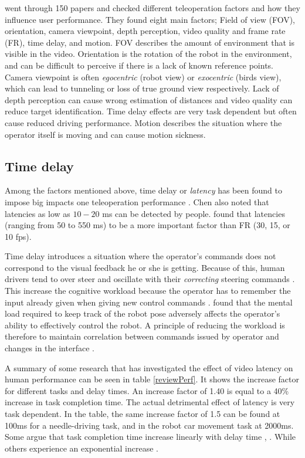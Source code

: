 \citet{Chen2007} went through 150 papers and checked different teleoperation factors and how they influence user performance. They found eight main factors; Field of view (FOV), orientation, camera viewpoint, depth perception, video quality and frame rate (FR), time delay, and motion. FOV describes the amount of environment that is visible in the video. Orientation is the rotation of the robot in the environment, and can be difficult to perceive if there is a lack of known reference points. Camera viewpoint is often \emph{egocentric} (robot view) or \emph{exocentric} (birds view), which can lead to tunneling or loss of true ground view respectively. Lack of depth perception can cause wrong estimation of distances and video quality can reduce target identification. Time delay effects are very task dependent but often cause reduced driving performance. Motion describes the situation where the operator itself is moving and can cause motion sickness.


\subsection{Time delay}
Among the factors mentioned above, time delay or \emph{latency} has been found to impose big impacts one teleoperation performance \citep{Chen2007}. Chen also noted that latencies as low as $10-20$ ms can be detected by people. \citet{Arthur1993} found that latencies (ranging from 50 to 550 ms) to be a more important factor than FR (30, 15, or 10 fps). 

Time delay introduces a situation where the operator's commands does not correspond to the visual feedback he or she is getting. Because of this, human drivers tend to over steer and oscillate with their \emph{correcting} steering commands \citep{Appelqvist2007}. This increase the cognitive workload because the operator has to remember the input already given when giving new control commands \citep{Matheson2013}. \citet{Ricks2004} found that the mental load required to keep track of the robot pose adversely affects the operator's ability to effectively control the robot. A principle of reducing the workload is therefore to maintain correlation between commands issued by operator and changes in the interface \citep{Nielsen2007}. 

A summary of some research that has investigated the effect of video latency on human performance can be seen in table \ref{reviewPerf}. It shows the increase factor for different tasks and delay times. An increase factor of 1.40 is equal to a 40\% increase in task completion time. The actual detrimental effect of latency is very task dependent. In the table, the same increase factor of 1.5 can be found at 100ms for a needle-driving task, and in the robot car movement task at 2000ms. Some argue that task completion time increase linearly with delay time \citep{Ando1999}, \citep{Lane2002}. While others experience an exponential increase \citep{Xu2014}.

